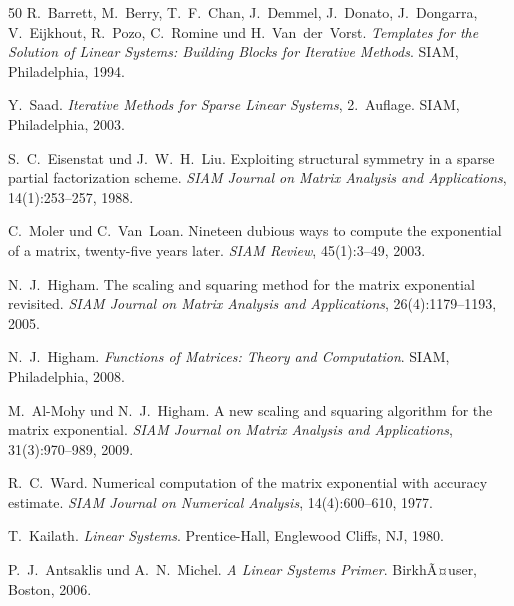 ﻿\documentclass[a4paper,12pt]{report}
\theoremstyle{definition}
\begin{document}
\begin{thebibliography}{50}
R.~Barrett, M.~Berry, T.~F.~Chan, J.~Demmel, J.~Donato, J.~Dongarra, V.~Eijkhout, R.~Pozo, C.~Romine und H.~Van~der~Vorst.
\newblock \textit{Templates for the Solution of Linear Systems: Building Blocks for Iterative Methods}.
\newblock SIAM, Philadelphia, 1994.

Y.~Saad.
\newblock \textit{Iterative Methods for Sparse Linear Systems}, 2.~Auflage.
\newblock SIAM, Philadelphia, 2003.

S.~C.~Eisenstat und J.~W.~H.~Liu.
\newblock Exploiting structural symmetry in a sparse partial factorization scheme.
\newblock \textit{SIAM Journal on Matrix Analysis and Applications}, 14(1):253--257, 1988.

C.~Moler und C.~Van~Loan.
\newblock Nineteen dubious ways to compute the exponential of a matrix, twenty-five years later.
\newblock \textit{SIAM Review}, 45(1):3--49, 2003.

N.~J.~Higham.
\newblock The scaling and squaring method for the matrix exponential revisited.
\newblock \textit{SIAM Journal on Matrix Analysis and Applications}, 26(4):1179--1193, 2005.

N.~J.~Higham.
\newblock \textit{Functions of Matrices: Theory and Computation}.
\newblock SIAM, Philadelphia, 2008.

M.~Al-Mohy und N.~J.~Higham.
\newblock A new scaling and squaring algorithm for the matrix exponential.
\newblock \textit{SIAM Journal on Matrix Analysis and Applications}, 31(3):970--989, 2009.

R.~C.~Ward.
\newblock Numerical computation of the matrix exponential with accuracy estimate.
\newblock \textit{SIAM Journal on Numerical Analysis}, 14(4):600--610, 1977.

T.~Kailath.
\newblock \textit{Linear Systems}.
\newblock Prentice-Hall, Englewood Cliffs, NJ, 1980.

P.~J.~Antsaklis und A.~N.~Michel.
\newblock \textit{A Linear Systems Primer}.
\newblock BirkhÃ¤user, Boston, 2006.


\end{thebibliography}
\end{document}
